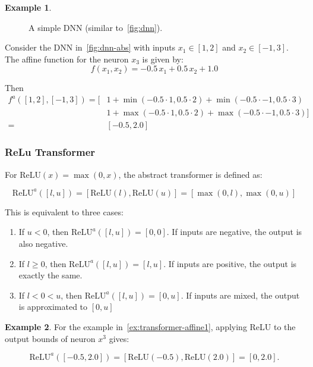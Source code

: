 \documentclass[oneside,11pt,dvipsnames]{book}
\numberwithin{equation}{section}
\theoremstyle{definition}
\newtheorem{example}{Example}[section]
\theoremstyle{remark}
\newcommand{\myrelu}{\mathrm{ReLU}}
\begin{document}
\begin{example}\label{ex:transformer-affine1}

\begin{figure}
\centering
{}
\caption{\label{fig:dnn-abs}A simple DNN (similar to~\autoref{fig:dnn}).}
\end{figure}    

Consider the DNN in~\autoref{fig:dnn-abs} with inputs \(x_1 \in [1, 2]\) and \(x_2 \in [-1, 3]\). The affine function for the neuron \(x_3\) is given by:
\[
f(x_1,x_2) = -0.5\,x_1 + 0.5\,x_2 + 1.0
\]

Then 
\[
\begin{aligned}
f^a([1,2],[-1,3]) = \Bigg[ &1 + \min(-0.5 \cdot 1, 0.5 \cdot 2) + \min(-0.5 \cdot -1, 0.5 \cdot 3)\\
& 1 + \max(-0.5 \cdot 1, 0.5 \cdot 2) + \max(-0.5 \cdot -1, 0.5 \cdot 3)\Bigg]\\
= & [-0.5, 2.0]
\end{aligned}
\]

\end{example}

\subsubsection{ReLu Transformer}
For \(\myrelu(x) = \max(0, x)\), the abstract transformer is defined as:

\[
\myrelu^a([l, u]) = [ \myrelu(l), \myrelu(u)] = [\max(0, l), \max(0, u)]
\]

This is equivalent to three cases: 
\begin{enumerate}
\item If $u < 0$, then $\myrelu^a([l, u]) = [0, 0]$.  If inputs are negative, the output is also negative.
\item If $l \ge 0$, then $\myrelu^a([l, u]) = [l, u]$. If inputs are positive, the output is exactly the same.
\item If $l < 0 < u$, then $\myrelu^a([l, u]) = [0, u]$. If inputs are mixed, the output is approximated to $[0, u]$

\end{enumerate}

\begin{example}
For the example in~\autoref{ex:transformer-affine1}, applying ReLU to the output bounds of neuron $x^3$ gives:

\[
\myrelu^a([-0.5, 2.0]) = [\myrelu(-0.5), \myrelu(2.0)] 
= [0, 2.0].
\]
\end{example}
\end{document}
